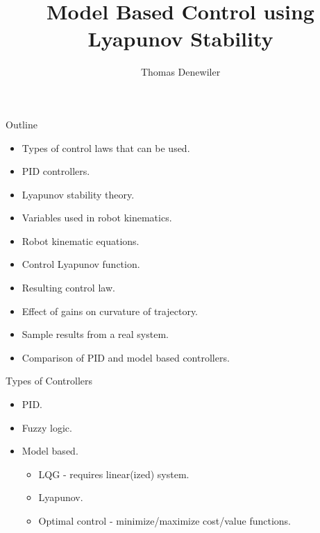 \documentclass[hyperref={pdfpagelabels=false}]{beamer}
\title{Model Based Control using Lyapunov Stability}
\author{Thomas Denewiler}
\institute{SPAWAR}
\begin{document}
\begin{frame}
\titlepage
\end{frame}

\begin{frame}{Outline}
\begin{itemize}
\item Types of control laws that can be used.
\item PID controllers.
\item Lyapunov stability theory.
\item Variables used in robot kinematics.
\item Robot kinematic equations.
\item Control Lyapunov function.
\item Resulting control law.
\item Effect of gains on curvature of trajectory.
\item Sample results from a real system.
\item Comparison of PID and model based controllers.
\end{itemize}
\end{frame}

\begin{frame}{Types of Controllers}
\begin{itemize}
\item PID.
\item Fuzzy logic.
\item Model based.
\begin{itemize}
\item LQG - requires linear(ized) system.
\item Lyapunov.
\item Optimal control - minimize/maximize cost/value functions.
\end{itemize}
\end{itemize}
\end{frame}
\end{document}
